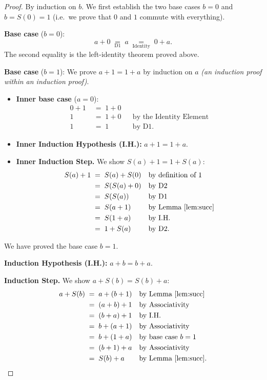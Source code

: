 \documentclass[12pt, a4paper]{article}
\theoremstyle{plain}
\theoremstyle{definition}
\begin{document}
\begin{proof}
By induction on $b$. We first establish the two base cases $b = 0$ and
$b = S(0) = 1$ (i.e.\ we prove that $0$ and $1$ commute with everything).

\medskip
\noindent\textbf{Base case} ($b = 0$):
\[
  a + 0
  \;\underset{\mathrm{D1}}{=}\; a
  \;\underset{\text{Identity}}{=}\; 0 + a.
\]
The second equality is the left-identity theorem proved above.

\medskip
\noindent\textbf{Base case} ($b = 1$):
We prove $a + 1 = 1 + a$ by induction on $a$
\emph{(an induction proof within an induction proof)}.

\begin{itemize}[leftmargin=2.5em]
  \item \textbf{Inner base case} ($a = 0$):
  \[
  \begin{aligned}
    0 + 1 &\;=\; 1 + 0 \\
    1     &\;=\; 1 + 0 &&\text{by the Identity Element}\\
    1     &\;=\; 1     &&\text{by D1.}
  \end{aligned}
  \]

  \item \textbf{Inner Induction Hypothesis (I.H.):} $a + 1 = 1 + a$.

  \item \textbf{Inner Induction Step.}
  We show $S(a) + 1 = 1 + S(a)$:
  \[
  \begin{aligned}
    S(a) + 1
      &\;=\; S(a) + S(0) &&\text{by definition of }1\\
      &\;=\; S(S(a) + 0) &&\text{by D2}\\
      &\;=\; S(S(a)    ) &&\text{by D1}\\
      &\;=\; S(a + 1)    &&\text{by Lemma~\ref{lem:succ}}\\
      &\;=\; S(1 + a)    &&\text{by I.H.}\\
      &\;=\; 1 + S(a)    &&\text{by D2.}
  \end{aligned}
  \]
\end{itemize}

We have proved the base case $b = 1$.

\medskip
\noindent\textbf{Induction Hypothesis (I.H.):} $a + b = b + a$.

\medskip
\noindent\textbf{Induction Step.} We show $a + S(b) = S(b) + a$:
\[
\begin{aligned}
  a + S(b)
    &\;=\; a + (b + 1)   &&\text{by Lemma~\ref{lem:succ}}\\
    &\;=\; (a + b) + 1   &&\text{by Associativity}\\
    &\;=\; (b + a) + 1   &&\text{by I.H.}\\
    &\;=\; b + (a + 1)   &&\text{by Associativity}\\
    &\;=\; b + (1 + a)   &&\text{by base case }b = 1\\
    &\;=\; (b + 1) + a   &&\text{by Associativity}\\
    &\;=\; S(b) + a      &&\text{by Lemma~\ref{lem:succ}.}
\end{aligned}
\]
\qedhere
\end{proof}
\end{document}
